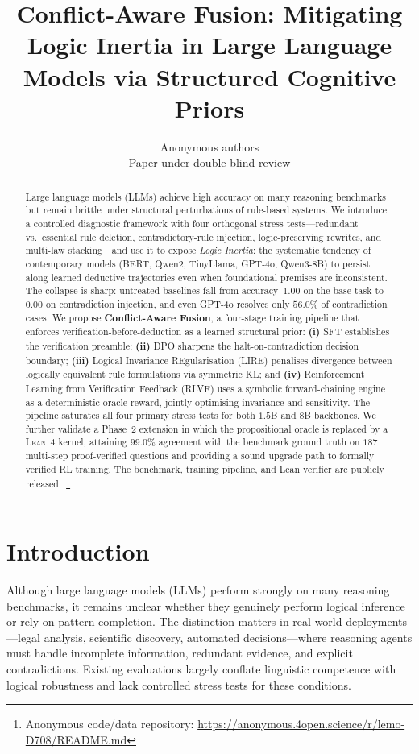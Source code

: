 \documentclass{article} %
\title{Conflict-Aware Fusion: Mitigating Logic Inertia in Large Language Models via Structured Cognitive Priors}
\author{Anonymous authors \\ Paper under double-blind review}
\begin{document}
\maketitle

\begin{abstract}
Large language models (LLMs) achieve high accuracy on many reasoning benchmarks but remain brittle under structural perturbations of rule-based systems. We introduce a controlled diagnostic framework with four orthogonal stress tests---redundant vs.\ essential rule deletion, contradictory-rule injection, logic-preserving rewrites, and multi-law stacking---and use it to expose \emph{Logic Inertia}: the systematic tendency of contemporary models (BERT, Qwen2, TinyLlama, GPT-4o, Qwen3-8B) to persist along learned deductive trajectories even when foundational premises are inconsistent. The collapse is sharp: untreated baselines fall from accuracy~$1.00$ on the base task to $0.00$ on contradiction injection, and even GPT-4o resolves only $56.0\%$ of contradiction cases. We propose \textbf{Conflict-Aware Fusion}, a four-stage training pipeline that enforces verification-before-deduction as a learned structural prior: \textbf{(i)} SFT establishes the verification preamble; \textbf{(ii)} DPO sharpens the halt-on-contradiction decision boundary; \textbf{(iii)} Logical Invariance REgularisation (LIRE) penalises divergence between logically equivalent rule formulations via symmetric KL; and \textbf{(iv)} Reinforcement Learning from Verification Feedback (RLVF) uses a symbolic forward-chaining engine as a deterministic oracle reward, jointly optimising invariance and sensitivity. The pipeline saturates all four primary stress tests for both $1.5$B and $8$B backbones. We further validate a Phase~2 extension in which the propositional oracle is replaced by a \textsc{Lean~4} kernel, attaining $99.0\%$ agreement with the benchmark ground truth on $187$ multi-step proof-verified questions and providing a sound upgrade path to formally verified RL training. The benchmark, training pipeline, and Lean verifier are publicly released.~\footnote{Anonymous code/data repository: \url{https://anonymous.4open.science/r/lemo-D708/README.md}}
\end{abstract}

\section{Introduction}
\label{sec:introduction}
Although large language models (LLMs) perform strongly on many reasoning benchmarks, it remains unclear whether they genuinely perform logical inference or rely on pattern completion. The distinction matters in real-world deployments---legal analysis, scientific discovery, automated decisions---where reasoning agents must handle incomplete information, redundant evidence, and explicit contradictions. Existing evaluations largely conflate linguistic competence with logical robustness and lack controlled stress tests for these conditions.
\end{document}
